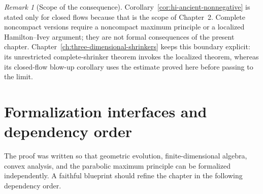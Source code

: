 \documentclass[10pt]{coll-l}
\theoremstyle{definition}
\theoremstyle{remark}
\newtheorem{remark}[theorem]{Remark}
\numberwithin{section}{chapter}
\numberwithin{equation}{chapter}
\begin{document}
\begin{remark}[Scope of the consequence]
\label{rem:hi-closed-scope}
Corollary~\ref{cor:hi-ancient-nonnegative} is stated only for closed flows
because that is the scope of Chapter~2.  Complete noncompact versions
require a noncompact maximum principle or a localized Hamilton--Ivey
argument; they are not formal consequences of the present chapter.
Chapter~\ref{ch:three-dimensional-shrinkers} keeps this boundary explicit:
its unrestricted complete-shrinker theorem invokes the localized theorem,
whereas its closed-flow blow-up corollary uses the estimate proved here
before passing to the limit.
\end{remark}

\section{Formalization interfaces and dependency order}
\label{sec:hi-formalization}

The proof was written so that geometric evolution, finite-dimensional
algebra, convex analysis, and the parabolic maximum principle can be
formalized independently.  A faithful blueprint should refine the chapter
in the following dependency order.
\end{document}
